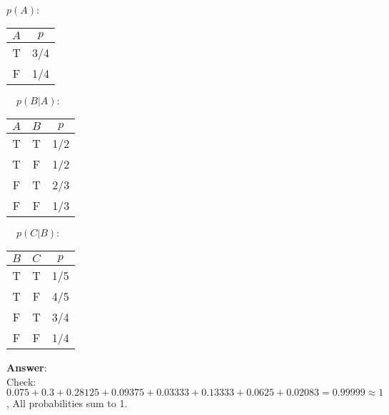 \documentclass[fleqn]{hw6}
\begin{document}
\(p(A):\) \begin{tabular}[t]{c|c}
  \(A\) & \(p\) \\\hline
  T & 3/4 \\
  F & 1/4
\end{tabular}
\(\quad p(B|A):\)
 \begin{tabular}[t]{c|c|c}
  \(A\) & \(B\) & \(p\) \\\hline
  T & T & 1/2 \\
  T & F & 1/2 \\
  F & T & 2/3 \\
  F & F & 1/3
\end{tabular}
\(\quad p(C|B):\)
 \begin{tabular}[t]{c|c|c}
  \(B\) & \(C\) & \(p\) \\\hline
  T & T & 1/5 \\
  T & F & 4/5 \\
  F & T & 3/4 \\
  F & F & 1/4 \\
\end{tabular} $\ $ \\ %
$\ $ \\ %
$\ $ \\ %
\textbf{Answer}: 
\\ %
$\ $ \\ %
Check: $ 0.075 + 0.3 + 0.28125 + 0.09375 + 0.03333 + 0.13333 + 0.0625 + 0.02083 = 0.99999 \approx 1 $ , All probabilities sum to 1.
\end{document}
